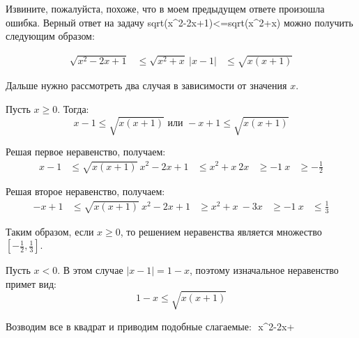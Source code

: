 
\usepackage{amsmath}
\usepackage[utf8]{inputenc}
\usepackage[T1]{fontenc}



Извините, пожалуйста, похоже, что в моем предыдущем ответе произошла ошибка. Верный ответ на задачу sqrt(x^2-2x+1)<=sqrt(x^2+x) можно получить следующим образом:

\begin{align*} \sqrt{x^2-2x+1} &\leq \sqrt{x^2+x} \ |x-1| &\leq \sqrt{x(x+1)} \end{align*}

Дальше нужно рассмотреть два случая в зависимости от значения $x$.

Пусть $x \geq 0$. Тогда: \[x-1 \leq \sqrt{x(x+1)} \text{ или } -x+1 \leq \sqrt{x(x+1)}\]

Решая первое неравенство, получаем: \[ \begin{aligned} x-1 &\leq \sqrt{x(x+1)} \ x^2-2x+1 &\leq x^2+x \ 2x &\geq -1 \ x &\geq -\frac{1}{2} \end{aligned} \]

Решая второе неравенство, получаем: \[ \begin{aligned} -x+1 &\leq \sqrt{x(x+1)} \ x^2-2x+1 &\geq x^2+x \ -3x &\geq -1 \ x &\leq \frac{1}{3} \end{aligned} \]

Таким образом, если $x \geq 0$, то решением неравенства является множество $[-\frac{1}{2}, \frac{1}{3}]$.

Пусть $x < 0$. В этом случае $|x-1|=1-x$, поэтому изначальное неравенство примет вид: \[ 1-x \leq \sqrt{x(x+1)} \]

Возводим все в квадрат и приводим подобные слагаемые: $$ x^2-2x+



